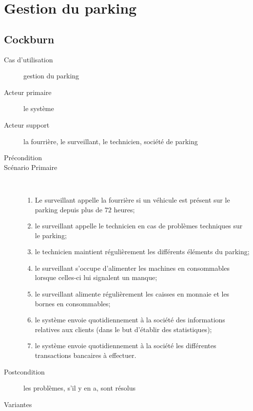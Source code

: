 \documentclass[a4paper]{article}
\begin{document}
\newpage

\section{Gestion du parking}
\subsection{Cockburn}
\begin{description}
	\item[Cas d'utilisation] gestion du parking
	\item[Acteur primaire] le syst\`eme
	\item[Acteur support]  la fourri\`ere, le surveillant, le technicien, soci\'et\'e
				de parking
	\item[Pr\'econdition] 
	\item[Sc\'enario Primaire] \
	\begin{enumerate}
		\item Le surveillant appelle la fourri\`ere si un v\'ehicule est
			pr\'esent sur le parking depuis plus de $72$ heures;
		\item le surveillant appelle le technicien en cas de probl\`emes
			techniques sur le parking;
		\item le technicien maintient r\'eguli\`erement les diff\'erents
			\'el\'ements du parking;
		\item le surveillant s'occupe d'alimenter les machines en consommables
			lorsque celles-ci lui signalent un manque;
		\item le surveillant alimente r\'eguli\`erement les caisses en
			monnaie et les bornes en consommables;
		\item le syst\`eme envoie quotidiennement \`a la soci\'et\'e des
			informations relatives aux clients (dans le but d'\'etablir des
			statistiques);
		\item le syst\`eme envoie quotidiennement \`a la soci\'et\'e les
			diff\'erentes transactions bancaires \`a effectuer.
	\end{enumerate}
	\item[Postcondition] les probl\`emes, s'il y en a, sont r\'esolus
	\item[Variantes] \
\end{description}
\end{document}
